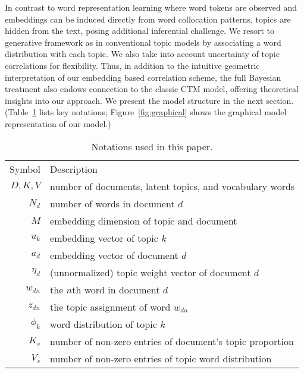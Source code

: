 \documentclass[sigconf]{acmart}
\renewcommand*{\bm}[1]{#1}%
\begin{document}
In contrast to word representation learning where word tokens are observed and embeddings can be induced directly from word collocation patterns, topics are hidden from the text, posing additional inferential challenge. 
We resort to generative framework as in conventional topic models by associating a word distribution with each topic. We also take into account uncertainty of topic correlations for flexibility. Thus, in addition to the intuitive geometric interpretation of our embedding based correlation scheme, the full Bayesian treatment also endows connection to the classic CTM model, offering theoretical insights into our approach. We present the model structure in the next section. (Table~\ref{tab:notation} lists key notations; Figure~\ref{fig:graphical} shows the graphical model representation of our model.)


\begin{table}
\centering
\small
\begin{tabular}{@{}r  l@{}}
  \midrule
  Symbol     & Description \\ \cmidrule{1-2} %
  $D, K, V$ & number of documents, latent topics, and vocabulary words \\
  $N_d$ & number of words in document $d$ \\ 
  $M$ & embedding dimension of topic and document \\
  $\bm{u}_k$ & embedding vector of topic $k$ \\
  $\bm{a}_d$ & embedding vector of document $d$ \\
  $\bm{\eta}_d$ & (unnormalized) topic weight vector of document $d$ \\
  $w_{dn}$ & the $n$th word in document $d$ \\
  $z_{dn}$ & the topic assignment of word $w_{dn}$ \\
  $\bm{\phi}_k$ & word distribution of topic $k$ \\
  $K_s$ & number of non-zero entries of document's topic proportion \\
  $V_s$ & number of non-zero entries of topic word distribution \\ 
  \midrule
\end{tabular}
\caption{Notations used in this paper.}
\label{tab:notation}
\vspace{-20pt}
\end{table}
\end{document}
